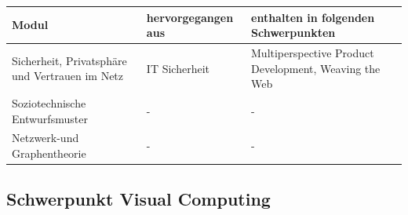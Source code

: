 \begin{longtable}[]{@{}lll@{}}
\toprule
\begin{minipage}[b]{0.33\columnwidth}\raggedright\strut
Modul\strut
\end{minipage} & \begin{minipage}[b]{0.33\columnwidth}\raggedright\strut
hervorgegangen aus\strut
\end{minipage} & \begin{minipage}[b]{0.33\columnwidth}\raggedright\strut
enthalten in folgenden Schwerpunkten\strut
\end{minipage}\tabularnewline
\midrule
\endhead
\begin{minipage}[t]{0.33\columnwidth}\raggedright\strut
Sicherheit, Privatsphäre und Vertrauen im Netz\strut
\end{minipage} & \begin{minipage}[t]{0.33\columnwidth}\raggedright\strut
IT Sicherheit\strut
\end{minipage} & \begin{minipage}[t]{0.33\columnwidth}\raggedright\strut
Multiperspective Product Development, Weaving the Web\strut
\end{minipage}\tabularnewline
\begin{minipage}[t]{0.33\columnwidth}\raggedright\strut
Soziotechnische Entwurfsmuster\strut
\end{minipage} & \begin{minipage}[t]{0.33\columnwidth}\raggedright\strut
-\strut
\end{minipage} & \begin{minipage}[t]{0.33\columnwidth}\raggedright\strut
-\strut
\end{minipage}\tabularnewline
\begin{minipage}[t]{0.33\columnwidth}\raggedright\strut
Netzwerk-und Graphentheorie\strut
\end{minipage} & \begin{minipage}[t]{0.33\columnwidth}\raggedright\strut
-\strut
\end{minipage} & \begin{minipage}[t]{0.33\columnwidth}\raggedright\strut
-\strut
\end{minipage}\tabularnewline
\bottomrule
\end{longtable}

\subsection{Schwerpunkt Visual
Computing}\label{schwerpunkt-visual-computing}

